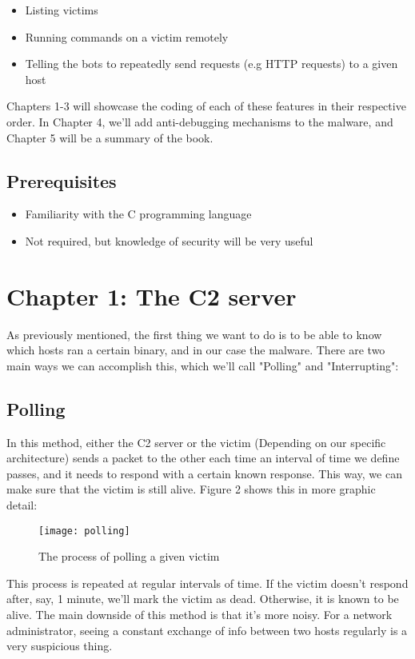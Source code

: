 \documentclass{article}
\begin{document}
\begin{itemize}
  \item Listing victims
  \item Running commands on a victim remotely
  \item Telling the bots to repeatedly send requests (e.g HTTP requests) to a given host
\end{itemize}

Chapters 1-3 will showcase the coding of each of these features in their respective order. In Chapter 4, we'll add anti-debugging mechanisms to the malware, and Chapter 5 will be a summary of the book.

\subsection{Prerequisites}
\begin{itemize}
    \item Familiarity with the C programming language
    \item Not required, but knowledge of security will be very useful
\end{itemize}

\section{Chapter 1: The C2 server}
As previously mentioned, the first thing we want to do is to be able to know which hosts ran a certain binary, and in our case the malware. There are two main ways we can accomplish this, which we'll call "Polling" and "Interrupting":

\subsection{Polling}
In this method, either the C2 server or the victim (Depending on our specific architecture) sends a packet to the other each time an interval of time we define passes, and it needs to respond with a certain known response. This way, we can make sure that the victim is still alive. Figure 2 shows this in more graphic detail:

\begin{figure}[h]
    \centering
    \texttt{[image: polling]}
    \caption{The process of polling a given victim}
    \label{fig:polling}
\end{figure}

This process is repeated at regular intervals of time. If the victim doesn't respond after, say, 1 minute, we'll mark the victim as dead. Otherwise, it is known to be alive. The main downside of this method is that it's more noisy. For a network administrator, seeing a constant exchange of info between two hosts regularly is a very suspicious thing.
\end{document}
